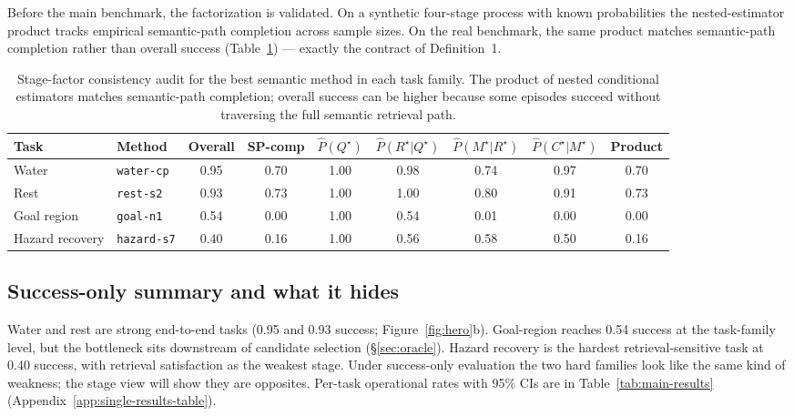\documentclass{article}
\begin{document}
Before the main benchmark, the factorization is validated. On a
synthetic four-stage process with known probabilities the
nested-estimator product tracks empirical semantic-path completion
across sample sizes. On the real benchmark, the same product matches
semantic-path completion rather than overall success
(Table~\ref{tab:consistency}) --- exactly the contract of
Definition~1.

\begin{table}[t]
  \caption{Stage-factor consistency audit for the best semantic method in each task family. The product of nested conditional estimators matches semantic-path completion; overall success can be higher because some episodes succeed without traversing the full semantic retrieval path.}
  \label{tab:consistency}
  \centering
  \small
  \setlength{\tabcolsep}{2pt}
  \begin{tabular}{p{1.7cm}p{2.5cm}c c c c c c c}
    \toprule
    Task & Method & Overall & SP-comp & $\hat P(Q^\star)$ & $\hat P(R^\star|Q^\star)$ & $\hat P(M^\star|R^\star)$ & $\hat P(C^\star|M^\star)$ & Product \\
    \midrule
    Water & \texttt{water-cp} & 0.95 & 0.70 & 1.00 & 0.98 & 0.74 & 0.97 & 0.70 \\
    Rest & \texttt{rest-s2} & 0.93 & 0.73 & 1.00 & 1.00 & 0.80 & 0.91 & 0.73 \\
    Goal region & \texttt{goal-n1} & 0.54 & 0.00 & 1.00 & 0.54 & 0.01 & 0.00 & 0.00 \\
    Hazard recovery & \texttt{hazard-s7} & 0.40 & 0.16 & 1.00 & 0.56 & 0.58 & 0.50 & 0.16 \\
    \bottomrule
  \end{tabular}
\end{table}

\subsection{Success-only summary and what it hides}
\label{sec:single-results}

Water and rest are strong end-to-end tasks (0.95 and 0.93 success; Figure~\ref{fig:hero}b). Goal-region reaches 0.54 success at the task-family level, but the bottleneck sits downstream of candidate selection (\S\ref{sec:oracle}). Hazard recovery is the hardest retrieval-sensitive task at 0.40 success, with retrieval satisfaction as the weakest stage. Under success-only evaluation the two hard families look like the same kind of weakness; the stage view will show they are opposites. Per-task operational rates with 95\% CIs are in Table~\ref{tab:main-results} (Appendix~\ref{app:single-results-table}).
\end{document}
